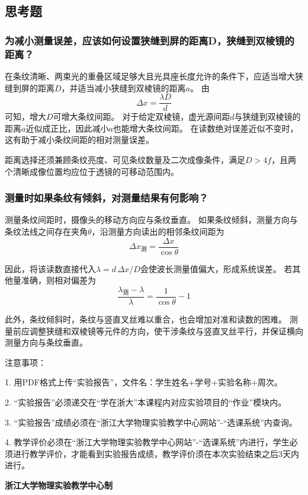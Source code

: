 \documentclass[10pt,a4paper]{ctexart} %
\begin{document}
  \subsection{思考题}

    \subsubsection{为减小测量误差，应该如何设置狭缝到屏的距离D，狭缝到双棱镜的距离？}
    在条纹清晰、两束光的重叠区域足够大且光具座长度允许的条件下，应适当增大狭缝到屏的距离$D$，并适当减小狭缝到双棱镜的距离$a$。
    由
    \[
      \Delta x=\frac{\lambda D}{d}
    \]
    可知，增大$D$可增大条纹间距。
    对于给定双棱镜，虚光源间距$d$与狭缝到双棱镜的距离$a$近似成正比，因此减小$a$也能增大条纹间距。
    在读数绝对误差近似不变时，这有助于减小条纹间距的相对测量误差。

    距离选择还须兼顾条纹亮度、可见条纹数量及二次成像条件，满足$D>4f$，且两个清晰成像位置均应位于透镜的可移动范围内。

    \subsubsection{测量时如果条纹有倾斜，对测量结果有何影响？}
    测量条纹间距时，摄像头的移动方向应与条纹垂直。
    如果条纹倾斜，测量方向与条纹法线之间存在夹角$\theta$，沿测量方向读出的相邻条纹间距为
    \[
      \Delta x_{\text{测}}=\frac{\Delta x}{\cos\theta}
    \]
    
    因此，将该读数直接代入$\lambda=d\,\Delta x/D$会使波长测量值偏大，形成系统误差。
    若其他量准确，则相对偏差为
    \[
      \frac{\lambda_{\text{测}}-\lambda}{\lambda}
      =\frac{1}{\cos\theta}-1
    \]

    此外，条纹倾斜时，条纹与竖直叉丝难以重合，也会增加对准和读数的困难。
    测量前应调整狭缝和双棱镜等元件的方向，使干涉条纹与竖直叉丝平行，并保证横向测量方向与条纹垂直。

\vspace*{\fill} %
\noindent
\begin{minipage}{\textwidth}
  注意事项：

  \begingroup
    \setlength{\leftskip}{2em} %
    1. 用PDF格式上传“实验报告”，文件名：学生姓名+学号+实验名称+周次。

    2. “实验报告”必须递交在“学在浙大”本课程内对应实验项目的“作业”模块内。

    3. “实验报告”成绩必须在“浙江大学物理实验教学中心网站”-“选课系统”内查询。

    4. 教学评价必须在“浙江大学物理实验教学中心网站”-“选课系统”内进行，学生必须进行教学评价，才能看到实验报告成绩，教学评价须在本次实验结束之后3天内进行。\par
  \endgroup

  \begin{center}
    {\bfseries 浙江大学物理实验教学中心制}
  \end{center}
\end{minipage}
\end{document}
